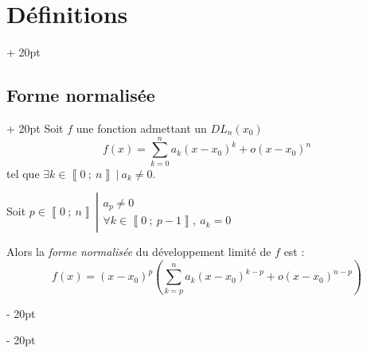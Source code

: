 \documentclass[a4paper, 12pt, twoside]{article}
\newcommand{\nset}[2]{\left\llbracket #1\ ;\ #2 \right\rrbracket}
\newcommand{\lr}[1]{\left( #1 \right)}
\newcommand{\ind}[1][20pt]{\advance\leftskip + #1}
\newcommand{\deind}[1][20pt]{\advance\leftskip - #1}
\newenvironment{indt}[2][20pt]{#2 \par \ind[#1]}{\par \deind} %
\begin{document}
\begin{indt}{\section{Définitions}}
        \vspace{12pt}
        
        \begin{indt}{\subsection{Forme normalisée}}
            Soit $f$ une fonction admettant un $DL_n(x_0)$
                \[ f(x) = \sum_{k = 0}^n a_k (x - x_0)^k + o(x - x_0)^n \]
            tel que $\exists k \in \nset 0 n\ |\ a_k \neq 0$.
            
            \vspace{6pt}
            
            Soit
            $
                p \in \nset 0 n\
                \left| \!
                \begin{array}{l}
                    a_p \neq 0
                    \\
                    \forall k \in \nset{0}{p - 1},\ a_k = 0
                \end{array}
                \right.
            $
            
            Alors la \textit{forme normalisée} du développement limité de $f$ est :
                \[ f(x) = (x - x_0)^p \lr{\sum_{k = p}^n a_k (x - x_0)^{k - p} + o(x - x_0)^{n - p}} \]
        \end{indt}
        
    \end{indt}
    
\end{document}
